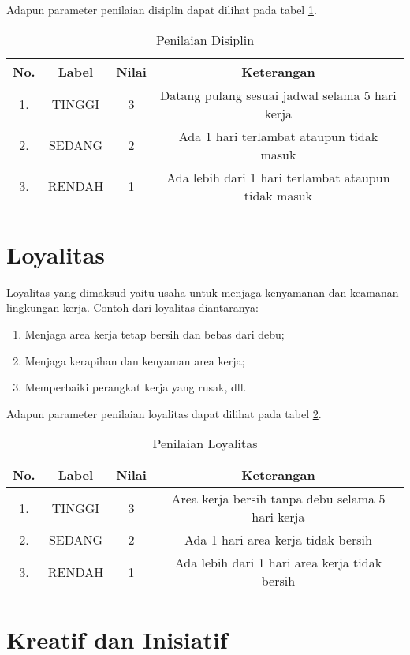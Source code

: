 Adapun parameter penilaian disiplin dapat dilihat pada tabel \ref{tab:nilaidisiplin}.

\begin{table}[H]
\caption{Penilaian Disiplin}
\centering
\begin{tabular}{|c|c|c|c|}
\hline
\textbf{No.}&\textbf{Label}&\textbf{Nilai}&\textbf{Keterangan}\\
\hline
1.&TINGGI&3&Datang pulang sesuai jadwal selama 5 hari kerja\\
\hline
2.&SEDANG&2&Ada 1 hari terlambat ataupun tidak masuk\\
\hline
3.&RENDAH&1&Ada lebih dari 1 hari terlambat ataupun tidak masuk\\
\hline
\end{tabular}
\label{tab:nilaidisiplin}
\end{table}

\section{Loyalitas}
Loyalitas yang dimaksud yaitu usaha untuk menjaga kenyamanan dan keamanan lingkungan kerja. Contoh dari loyalitas diantaranya:
\begin{enumerate}
\item Menjaga area kerja tetap bersih dan bebas dari debu;
\item Menjaga kerapihan dan kenyaman area kerja;
\item Memperbaiki perangkat kerja yang rusak, dll.
\end{enumerate}
Adapun parameter penilaian loyalitas dapat dilihat pada tabel \ref{tab:nilailoyalitas}.

\begin{table}[H]
\caption{Penilaian Loyalitas}
\centering
\begin{tabular}{|c|c|c|c|}
\hline
\textbf{No.}&\textbf{Label}&\textbf{Nilai}&\textbf{Keterangan}\\
\hline
1.&TINGGI&3&Area kerja bersih tanpa debu selama 5 hari kerja\\
\hline
2.&SEDANG&2&Ada 1 hari area kerja tidak bersih\\
\hline
3.&RENDAH&1&Ada lebih dari 1 hari area kerja tidak bersih\\
\hline
\end{tabular}
\label{tab:nilailoyalitas}
\end{table}

\section{Kreatif dan Inisiatif}

